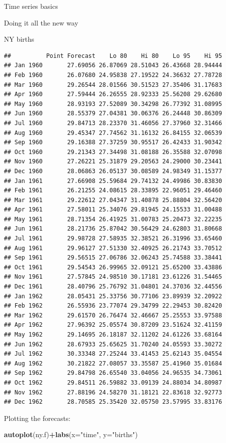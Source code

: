 \documentclass[ignorenonframetext,]{beamer}
\newenvironment{Shaded}{\begin{snugshade}}{\end{snugshade}}
\newcommand{\DataTypeTok}[1]{\textcolor[rgb]{0.13,0.29,0.53}{#1}}
\newcommand{\KeywordTok}[1]{\textcolor[rgb]{0.13,0.29,0.53}{\textbf{#1}}}
\newcommand{\NormalTok}[1]{#1}
\newcommand{\OperatorTok}[1]{\textcolor[rgb]{0.81,0.36,0.00}{\textbf{#1}}}
\newcommand{\StringTok}[1]{\textcolor[rgb]{0.31,0.60,0.02}{#1}}
\begin{document}
\begin{frame}[fragile]{Time series basics}
\begin{block}{Doing it all the new way}
\begin{block}{NY births}
\begin{verbatim}
##          Point Forecast    Lo 80    Hi 80    Lo 95    Hi 95
## Jan 1960       27.69056 26.87069 28.51043 26.43668 28.94444
## Feb 1960       26.07680 24.95838 27.19522 24.36632 27.78728
## Mar 1960       29.26544 28.01566 30.51523 27.35406 31.17683
## Apr 1960       27.59444 26.26555 28.92333 25.56208 29.62680
## May 1960       28.93193 27.52089 30.34298 26.77392 31.08995
## Jun 1960       28.55379 27.04381 30.06376 26.24448 30.86309
## Jul 1960       29.84713 28.23370 31.46056 27.37960 32.31466
## Aug 1960       29.45347 27.74562 31.16132 26.84155 32.06539
## Sep 1960       29.16388 27.37259 30.95517 26.42433 31.90342
## Oct 1960       29.21343 27.34498 31.08188 26.35588 32.07098
## Nov 1960       27.26221 25.31879 29.20563 24.29000 30.23441
## Dec 1960       28.06863 26.05137 30.08589 24.98349 31.15377
## Jan 1961       27.66908 25.59684 29.74132 24.49986 30.83830
## Feb 1961       26.21255 24.08615 28.33895 22.96051 29.46460
## Mar 1961       29.22612 27.04347 31.40878 25.88804 32.56420
## Apr 1961       27.58011 25.34076 29.81945 24.15533 31.00488
## May 1961       28.71354 26.41925 31.00783 25.20473 32.22235
## Jun 1961       28.21736 25.87042 30.56429 24.62803 31.80668
## Jul 1961       29.98728 27.58935 32.38521 26.31996 33.65460
## Aug 1961       29.96127 27.51330 32.40925 26.21743 33.70512
## Sep 1961       29.56515 27.06786 32.06243 25.74588 33.38441
## Oct 1961       29.54543 26.99965 32.09121 25.65200 33.43886
## Nov 1961       27.57845 24.98510 30.17181 23.61226 31.54465
## Dec 1961       28.40796 25.76792 31.04801 24.37036 32.44556
## Jan 1962       28.05431 25.33756 30.77106 23.89939 32.20922
## Feb 1962       26.55936 23.77074 29.34799 22.29453 30.82420
## Mar 1962       29.61570 26.76474 32.46667 25.25553 33.97588
## Apr 1962       27.96392 25.05574 30.87209 23.51624 32.41159
## May 1962       29.14695 26.18187 32.11202 24.61226 33.68164
## Jun 1962       28.67933 25.65625 31.70240 24.05593 33.30272
## Jul 1962       30.33348 27.25244 33.41453 25.62143 35.04554
## Aug 1962       30.21822 27.08057 33.35587 25.41960 35.01684
## Sep 1962       29.84798 26.65540 33.04056 24.96535 34.73061
## Oct 1962       29.84511 26.59882 33.09139 24.88034 34.80987
## Nov 1962       27.88196 24.58270 31.18121 22.83618 32.92773
## Dec 1962       28.70585 25.35420 32.05750 23.57995 33.83176
\end{verbatim}

Plotting the forecasts:

\begin{Shaded}
\begin{Highlighting}[]
\KeywordTok{autoplot}\NormalTok{(ny.f)}\OperatorTok{+}\KeywordTok{labs}\NormalTok{(}\DataTypeTok{x=}\StringTok{"time"}\NormalTok{, }\DataTypeTok{y=}\StringTok{"births"}\NormalTok{)}
\end{Highlighting}
\end{Shaded}


\end{block}
\end{block}
\end{frame}
\end{document}
